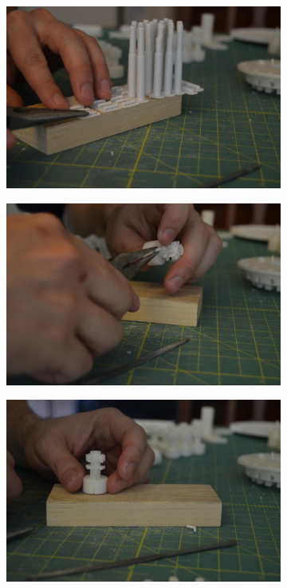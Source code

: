 \documentclass[openany]{book}
\begin{document}
\begin{figure}[!ht]
	\centering
	\begin{subfigure}{.4\textwidth}
		\centering
		\includegraphics[width=.95\textwidth]{images/image58.jpg}
		\caption{}
		\label{fig:image58}	
	\end{subfigure}
	\begin{subfigure}{.4\textwidth}
		\centering
		\includegraphics[width=.95\textwidth]{images/image43.jpg}
		\caption{}
		\label{fig:image43}	
	\end{subfigure}
	
	\begin{subfigure}{.4\textwidth}
		\centering
		\includegraphics[width=.95\textwidth]{images/image51.jpg}
		\caption{}
		\label{fig:image51}	
	\end{subfigure}
	\caption{}
\end{figure}
\end{document}
